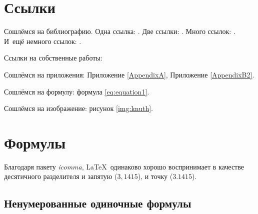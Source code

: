 \section{Ссылки} \label{sect1_2}
Сошлёмся на библиографию.
Одна ссылка: \cite[с.~54]{Sokolov}\cite[с.~36]{Gaidaenko}.
Две ссылки: \cite{Sokolov,Gaidaenko}.
Много ссылок: %
\cite{Lermontov,Management,Borozda,Marketing,Constitution,FamilyCode,Gost.7.0.53,Razumovski,Lagkueva,Pokrovski,Sirotko,Lukina,Methodology,Encyclopedia,Nasirova,Berestova,Kriger}.
И~ещё немного ссылок:
\cite{Article,Book,Booklet,Conference,Inbook,Incollection,Manual,Mastersthesis,Misc,Phdthesis,Proceedings,Techreport,Unpublished}.
\cite{medvedev2006jelektronnye, CEAT:CEAT581, doi:10.1080/01932691.2010.513279,Gosele1999161,Li2007StressAnalysis, Shoji199895,test:eisner-sample,AB_patent_Pomerantz_1968,iofis_patent1960}



Ссылки на собственные работы:~\cite{vakbib1, confbib1}

Сошлёмся на приложения: Приложение \ref{AppendixA}, Приложение \ref{AppendixB2}.

Сошлёмся на формулу: формула \eqref{eq:equation1}.

Сошлёмся на изображение: рисунок \ref{img:knuth}.


\section{Формулы} \label{sect1_3}

Благодаря пакету \textit{icomma}, \LaTeX~одинаково хорошо воспринимает в качестве десятичного разделителя и запятую ($3,1415$), и точку ($3.1415$).

\subsection{Ненумерованные одиночные формулы} \label{subsect1_3_1}

